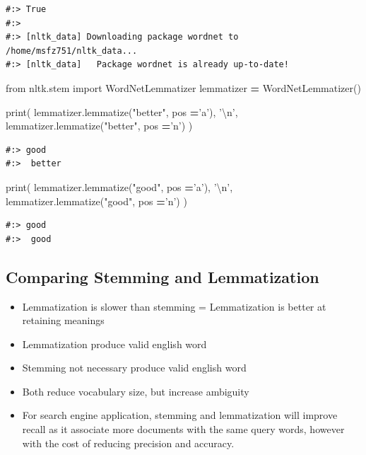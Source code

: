 \documentclass[
]{book}
\newenvironment{Shaded}{\begin{snugshade}}{\end{snugshade}}
\newcommand{\BuiltInTok}[1]{#1}
\newcommand{\CharTok}[1]{\textcolor[rgb]{0.5,0.5,0.5}{#1}}
\newcommand{\ImportTok}[1]{#1}
\newcommand{\NormalTok}[1]{#1}
\newcommand{\OperatorTok}[1]{\textcolor[rgb]{0.43,0.43,0.43}{\textbf{#1}}}
\newcommand{\StringTok}[1]{\textcolor[rgb]{0.5,0.5,0.5}{#1}}
\providecommand{\tightlist}{%
  \setlength{\itemsep}{0pt}\setlength{\parskip}{0pt}}
\begin{document}
\begin{verbatim}
#:> True
#:> 
#:> [nltk_data] Downloading package wordnet to /home/msfz751/nltk_data...
#:> [nltk_data]   Package wordnet is already up-to-date!
\end{verbatim}

\begin{Shaded}
\begin{Highlighting}[]
\ImportTok{from}\NormalTok{ nltk.stem }\ImportTok{import}\NormalTok{ WordNetLemmatizer}
\NormalTok{lemmatizer }\OperatorTok{=}\NormalTok{ WordNetLemmatizer()}

\BuiltInTok{print}\NormalTok{( lemmatizer.lemmatize(}\StringTok{"better"}\NormalTok{, pos }\OperatorTok{=}\StringTok{'a'}\NormalTok{), }\StringTok{'}\CharTok{\textbackslash{}n}\StringTok{'}\NormalTok{,}
\NormalTok{       lemmatizer.lemmatize(}\StringTok{"better"}\NormalTok{, pos }\OperatorTok{=}\StringTok{'n'}\NormalTok{) )}
\end{Highlighting}
\end{Shaded}

\begin{verbatim}
#:> good 
#:>  better
\end{verbatim}

\begin{Shaded}
\begin{Highlighting}[]
\BuiltInTok{print}\NormalTok{( lemmatizer.lemmatize(}\StringTok{"good"}\NormalTok{, pos }\OperatorTok{=}\StringTok{'a'}\NormalTok{), }\StringTok{'}\CharTok{\textbackslash{}n}\StringTok{'}\NormalTok{,}
\NormalTok{       lemmatizer.lemmatize(}\StringTok{"good"}\NormalTok{, pos }\OperatorTok{=}\StringTok{'n'}\NormalTok{) )}
\end{Highlighting}
\end{Shaded}

\begin{verbatim}
#:> good 
#:>  good
\end{verbatim}

\hypertarget{comparing-stemming-and-lemmatization}{%
\subsection{Comparing Stemming and Lemmatization}\label{comparing-stemming-and-lemmatization}}

\begin{itemize}
\tightlist
\item
  Lemmatization is slower than stemming = Lemmatization is better at retaining meanings
\item
  Lemmatization produce valid english word
\item
  Stemming not necessary produce valid english word
\item
  Both reduce vocabulary size, but increase ambiguity
\item
  For search engine application, stemming and lemmatization will improve recall as it associate more documents with the same query words, however with the cost of reducing precision and accuracy.
\end{itemize}
\end{document}
